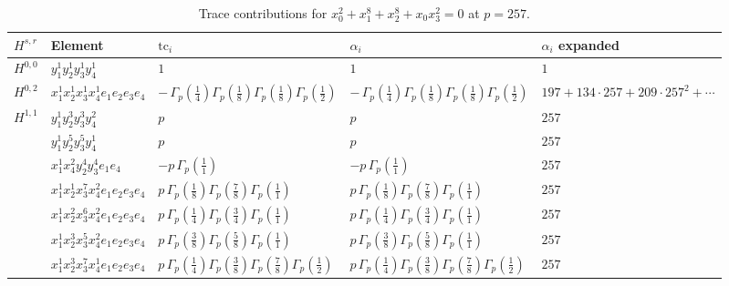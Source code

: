 \documentclass[11pt]{article}
\begin{document}
\begin{table}[ht]
\centering
\caption{Trace contributions for $x_0^{2} + x_1^{8} + x_2^{8} + x_0 x_3^{2} = 0$ at $p=257$.}\label{tab:deformed-10}
\renewcommand{\arraystretch}{1.1}
{\scriptsize
\begin{tabular}{@{}lllll@{}}
\toprule
$H^{s,r}$ & Element & $\mathrm{tc}_i$ & $\alpha_i$ & $\alpha_i$ expanded \\
\midrule
$H^{0,0}$ & $y_{1}^{1} y_{2}^{1} y_{3}^{1} y_{4}^{1}$ & $1$ & $1$ & $1$ \\
\midrule
$H^{0,2}$ & $x_{1}^{1} x_{2}^{1} x_{3}^{1} x_{4}^{1}  e_{1} e_{2} e_{3} e_{4}$ & $- \, \Gamma_p \left( \frac{1}{4} \right) \Gamma_p \left( \frac{1}{8} \right) \Gamma_p \left( \frac{1}{8} \right) \Gamma_p \left( \frac{1}{2} \right)$ & $- \, \Gamma_p \left( \frac{1}{4} \right) \Gamma_p \left( \frac{1}{8} \right) \Gamma_p \left( \frac{1}{8} \right) \Gamma_p \left( \frac{1}{2} \right)$ & $197{+}134{\cdot}257{+}209{\cdot}257^{2}{+}\cdots$ \\
\midrule
$H^{1,1}$ & $y_{1}^{1} y_{2}^{3} y_{3}^{3} y_{4}^{2}$ & $p \,$ & $p \,$ & $257$ \\
 & $y_{1}^{1} y_{2}^{5} y_{3}^{5} y_{4}^{1}$ & $p \,$ & $p \,$ & $257$ \\
 & $x_{1}^{1} x_{4}^{2} y_{2}^{4} y_{3}^{4} e_{1} e_{4}$ & $- p \, \Gamma_p \left( \frac{1}{1} \right)$ & $- p \, \Gamma_p \left( \frac{1}{1} \right)$ & $257$ \\
 & $x_{1}^{1} x_{2}^{1} x_{3}^{7} x_{4}^{2}  e_{1} e_{2} e_{3} e_{4}$ & $p \, \Gamma_p \left( \frac{1}{8} \right) \Gamma_p \left( \frac{7}{8} \right) \Gamma_p \left( \frac{1}{1} \right)$ & $p \, \Gamma_p \left( \frac{1}{8} \right) \Gamma_p \left( \frac{7}{8} \right) \Gamma_p \left( \frac{1}{1} \right)$ & $257$ \\
 & $x_{1}^{1} x_{2}^{2} x_{3}^{6} x_{4}^{2}  e_{1} e_{2} e_{3} e_{4}$ & $p \, \Gamma_p \left( \frac{1}{4} \right) \Gamma_p \left( \frac{3}{4} \right) \Gamma_p \left( \frac{1}{1} \right)$ & $p \, \Gamma_p \left( \frac{1}{4} \right) \Gamma_p \left( \frac{3}{4} \right) \Gamma_p \left( \frac{1}{1} \right)$ & $257$ \\
 & $x_{1}^{1} x_{2}^{3} x_{3}^{5} x_{4}^{2}  e_{1} e_{2} e_{3} e_{4}$ & $p \, \Gamma_p \left( \frac{3}{8} \right) \Gamma_p \left( \frac{5}{8} \right) \Gamma_p \left( \frac{1}{1} \right)$ & $p \, \Gamma_p \left( \frac{3}{8} \right) \Gamma_p \left( \frac{5}{8} \right) \Gamma_p \left( \frac{1}{1} \right)$ & $257$ \\
 & $x_{1}^{1} x_{2}^{3} x_{3}^{7} x_{4}^{1}  e_{1} e_{2} e_{3} e_{4}$ & $p \, \Gamma_p \left( \frac{1}{4} \right) \Gamma_p \left( \frac{3}{8} \right) \Gamma_p \left( \frac{7}{8} \right) \Gamma_p \left( \frac{1}{2} \right)$ & $p \, \Gamma_p \left( \frac{1}{4} \right) \Gamma_p \left( \frac{3}{8} \right) \Gamma_p \left( \frac{7}{8} \right) \Gamma_p \left( \frac{1}{2} \right)$ & $257$ \\

\end{tabular}}
\end{table}
\end{document}
